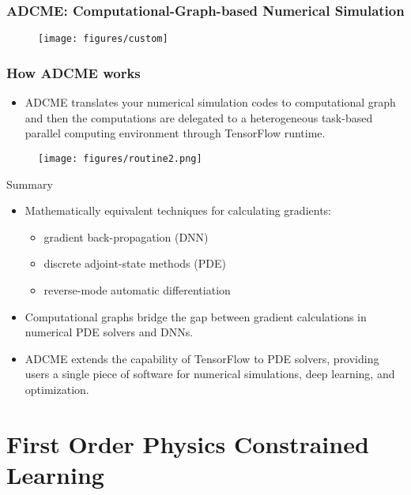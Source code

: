 \documentclass[usenames,dvipsnames]{beamer}
\begin{document}
\begin{frame}
	\frametitle{ADCME: Computational-Graph-based Numerical Simulation}
	
	\begin{figure}[hbt]
		\texttt{[image: figures/custom]}
	\end{figure}
\end{frame}

\begin{frame}
	\frametitle{How ADCME works}
	\begin{itemize}
		\item ADCME translates your numerical simulation codes to computational graph and then the computations are delegated to a heterogeneous task-based parallel computing environment through TensorFlow runtime. 
	\end{itemize}
	\begin{figure}[hbt]
		\texttt{[image: figures/routine2.png]}
	\end{figure}
\end{frame}

\begin{frame}{Summary}

\begin{itemize}
\item Mathematically equivalent techniques for calculating gradients:

\begin{itemize}
\item gradient back-propagation (DNN)
\item discrete adjoint-state methods (PDE)
\item reverse-mode automatic differentiation
\end{itemize}

\item Computational graphs bridge the gap between gradient calculations in numerical PDE solvers and DNNs. 

\item ADCME extends the capability of TensorFlow to PDE solvers, providing users a single piece of software for numerical simulations, deep learning, and optimization.


\end{itemize}

\end{frame}

\section{First Order Physics Constrained Learning}
\end{document}
